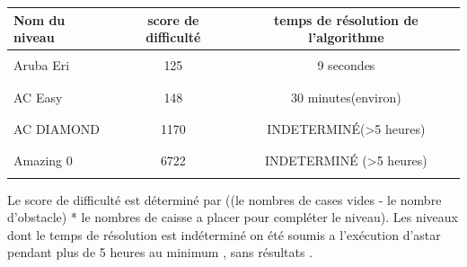 \documentclass{article}
\begin{document}
\begin{tabular}{|l || c | c |}
\hline
  Nom du niveau & score de difficulté & temps de résolution de l'algorithme \\
 \hline
 \hline
 & &\\
 Aruba Eri & 125 & 9 secondes  \\
  & &\\
  \hline
  & &\\
 AC Easy& 148 & 30 minutes(environ) \\
  & &\\
  \hline
  & &\\
 AC DIAMOND& 1170 & INDETERMINÉ(>5 heures) \\
  & &\\
  \hline
  & &\\
 Amazing 0& 6722 & INDETERMINÉ (>5 heures)\\
  & &\\
 \hline
 \end{tabular}
\vspace{1cm}



Le score de difficulté est déterminé par ((le nombres de cases vides - le nombre d'obstacle) * le nombres de caisse a placer pour compléter le niveau). Les niveaux dont le temps de résolution est indéterminé on été soumis a l'exécution d'astar pendant plus de 5 heures au minimum , sans résultats .

 
 
\end{document}
